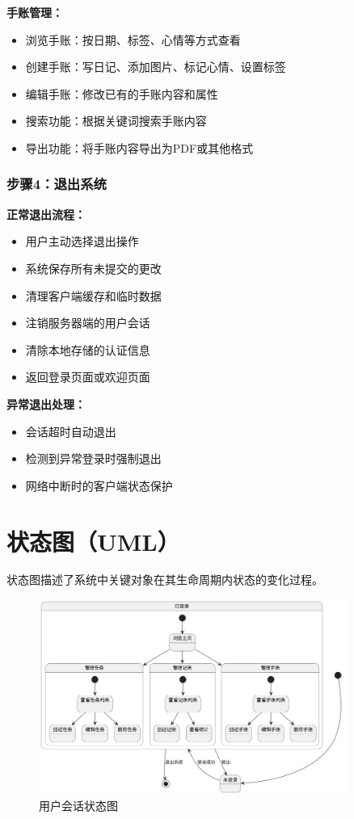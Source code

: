 \documentclass[a4paper]{article}
\begin{document}
\textbf{手账管理：}
\begin{itemize}
    \item 浏览手账：按日期、标签、心情等方式查看
    \item 创建手账：写日记、添加图片、标记心情、设置标签
    \item 编辑手账：修改已有的手账内容和属性
    \item 搜索功能：根据关键词搜索手账内容
    \item 导出功能：将手账内容导出为PDF或其他格式
\end{itemize}

\subsubsection{步骤4：退出系统}

\textbf{正常退出流程：}
\begin{itemize}
    \item 用户主动选择退出操作
    \item 系统保存所有未提交的更改
    \item 清理客户端缓存和临时数据
    \item 注销服务器端的用户会话
    \item 清除本地存储的认证信息
    \item 返回登录页面或欢迎页面
\end{itemize}

\textbf{异常退出处理：}
\begin{itemize}
    \item 会话超时自动退出
    \item 检测到异常登录时强制退出
    \item 网络中断时的客户端状态保护
\end{itemize}

\section{状态图（UML）}

状态图描述了系统中关键对象在其生命周期内状态的变化过程。

\begin{figure}[H]
\centering
\includegraphics[width=0.9\textwidth]{img/state_diagram.png}
\caption{用户会话状态图}
\end{figure}
\end{document}
